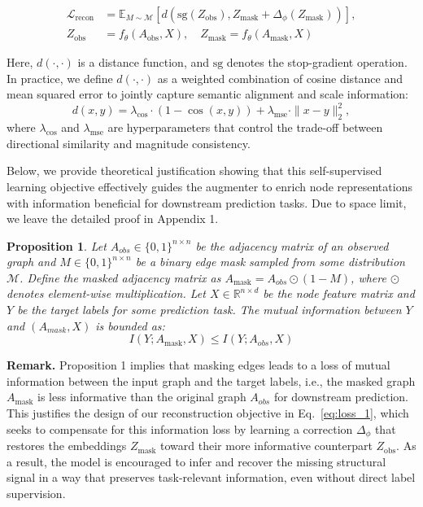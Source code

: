 \documentclass[letterpaper]{article} \usepackage{aaai2026}  \usepackage{times}  \usepackage{helvet}  \usepackage{courier}  \usepackage[hyphens]{url}  \usepackage{graphicx} \urlstyle{rm} \def\UrlFont{\rm}  \usepackage{natbib}  \usepackage{caption} \frenchspacing  \setlength{\pdfpagewidth}{8.5in}  \setlength{\pdfpageheight}{11in}
\newtheorem{proposition}{Proposition}
\begin{document}
\begin{equation}
\label{eq:loss_1}
\begin{aligned}
\mathcal{L}_{\text{recon}} &= \mathbb{E}_{M \sim \mathcal{M}} \left[ d(\text{sg}(Z_{\text{obs}}), Z_{\text{mask}} + \Delta_{\phi}(Z_{\text{mask}})) \right], \\
Z_{\text{obs}} &= f_{\theta}(A_{\text{obs}}, X), \quad
Z_{\text{mask}} = f_{\theta}(A_{\text{mask}}, X)
\end{aligned}
\end{equation}

Here, \( d(\cdot, \cdot) \) is a distance function, and \(\text{sg}\) denotes the stop-gradient operation. In practice, we define \( d(\cdot, \cdot) \) as a weighted combination of cosine distance and mean squared error to jointly capture semantic alignment and scale information:
\[
d(x, y) = \lambda_{\text{cos}} \cdot \left(1 - \cos(x, y)\right) + \lambda_{\text{mse}} \cdot \|x - y\|_2^2,
\]
where \(\lambda_{\text{cos}}\) and \(\lambda_{\text{mse}}\) are hyperparameters that control the trade-off between directional similarity and magnitude consistency.

Below, we provide theoretical justification showing that this self-supervised learning objective effectively guides the augmenter to enrich node representations with information beneficial for downstream prediction tasks. Due to space limit, we leave the detailed proof in Appendix 1.

\begin{proposition}
Let \( A_{obs} \in \{0,1\}^{n \times n} \) be the adjacency matrix of an observed graph and \( M \in \{0,1\}^{n \times n} \) be a binary edge mask sampled from some distribution \( \mathcal{M} \). Define the masked adjacency matrix as \( A_{\text{mask}} = A_{obs} \odot (1 - M) \), where \( \odot \) denotes element-wise multiplication. Let \( X \in \mathbb{R}^{n \times d} \) be the node feature matrix and \( Y \) be the target labels for some prediction task. The mutual information between $Y$ and $(A_{mask}, X)$ is bounded as:
\[
I(Y; A_{\text{mask}} , X) \leq I(Y; A_{obs} , X)
\]
\end{proposition}

\textbf{Remark.}
Proposition 1 implies that masking edges leads to a loss of mutual information between the input graph and the target labels, i.e., the masked graph \( A_{\text{mask}} \) is less informative than the original graph \( A_{obs} \) for downstream prediction. This justifies the design of our reconstruction objective in Eq.~\ref{eq:loss_1}, which seeks to compensate for this information loss by learning a correction \( \Delta_\phi \) that restores the embeddings \( Z_{\text{mask}} \) toward their more informative counterpart \( Z_{\text{obs}} \). As a result, the model is encouraged to infer and recover the missing structural signal in a way that preserves task-relevant information, even without direct label supervision.
\end{document}
